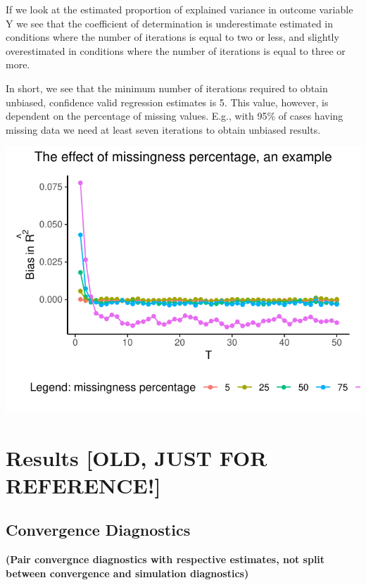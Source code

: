 \documentclass[Royal,times,sageh]{sagej}
\begin{document}
If we look at the estimated proportion of explained variance in outcome
variable Y we see that the coefficient of determination is underestimate
estimated in conditions where the number of iterations is equal to two
or less, and slightly overestimated in conditions where the number of
iterations is equal to three or more.

In short, we see that the minimum number of iterations required to
obtain unbiased, confidence valid regression estimates is 5. This value,
however, is dependent on the percentage of missing values. E.g., with
95\% of cases having missing data we need at least seven iterations to
obtain unbiased results.

\begin{flushleft}\includegraphics{manuscript_files/figure-latex/unnamed-chunk-3-1} \end{flushleft}

\hypertarget{results-old-just-for-reference}{%
\section{Results {[}OLD, JUST FOR
REFERENCE!{]}}\label{results-old-just-for-reference}}

\hypertarget{convergence-diagnostics-1}{%
\subsection{Convergence Diagnostics}\label{convergence-diagnostics-1}}

\textbf{(Pair convergnce diagnostics with respective estimates, not
split between convergence and simulation diagnostics)}
\end{document}
